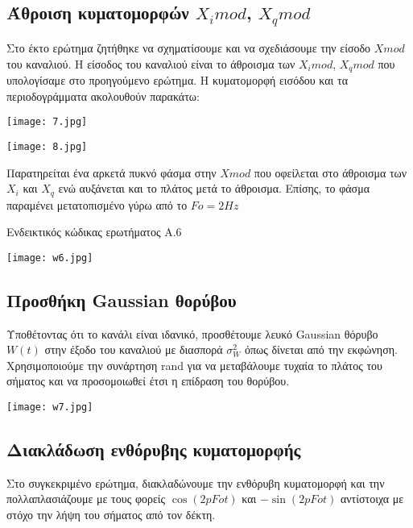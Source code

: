 \documentclass[11pt]{article}
\begin{document}
\subsection{Άθροιση κυματομορφών $X_imod$, $X_qmod$}
Στο έκτο ερώτημα ζητήθηκε να σχηματίσουμε και να σχεδιάσουμε την είσοδο $Χmod$ του καναλιού. Η είσοδος του καναλιού είναι το άθροισμα των $X_imod$, $X_qmod$ που υπολογίσαμε στο προηγούμενο ερώτημα. Η κυματομορφή εισόδου και τα περιοδογράμματα ακολουθούν παρακάτω:

\begin{center}
	\texttt{[image: 7.jpg]}
\end{center}

\begin{center}
	\texttt{[image: 8.jpg]}
\end{center}
Παρατηρείται ένα αρκετά πυκνό φάσμα στην $Xmod$ που οφείλεται στο άθροισμα των $Χ_i$ και $Χ_q$ ενώ αυξάνεται και το πλάτος μετά το άθροισμα. Επίσης, το φάσμα παραμένει μετατοπισμένο γύρω από το $Fo=2Hz$ 

Ενδεικτικός κώδικας ερωτήματος Α.6
\begin{center}
	\texttt{[image: w6.jpg]}
\end{center}

\subsection{Προσθήκη \foreignlanguage{english}{Gaussian} θορύβου}
Υποθέτοντας ότι το κανάλι είναι ιδανικό, προσθέτουμε λευκό \foreignlanguage{english}{Gaussian} θόρυβο $W(t)$ στην έξοδο του καναλιού με διασπορά $\sigma^2_W$ όπως δίνεται από την εκφώνηση. Χρησιμοποιούμε την συνάρτηση \foreignlanguage{english}{rand} για να μεταβάλουμε τυχαία το πλάτος του σήματος και να προσομοιωθεί έτσι η επίδραση του θορύβου.

\begin{center}
	\texttt{[image: w7.jpg]}
\end{center}

\subsection{Διακλάδωση ενθόρυβης κυματομορφής}
Στο συγκεκριμένο ερώτημα, διακλαδώνουμε την ενθόρυβη κυματομορφή και την πολλαπλασιάζουμε με τους φορείς $\cos(2pFot)$ και $-\sin(2pFot)$ αντίστοιχα με στόχο την λήψη του σήματος από τον δέκτη. 
\end{document}
